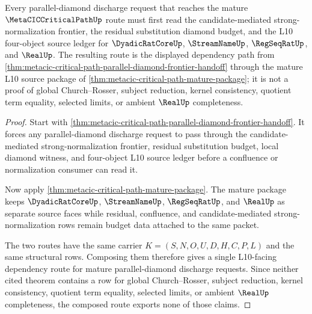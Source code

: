 \begin{theorem}
\label{thm:metaciccriticalpath-mature-l10-parallel-diamond-route}
Every parallel-diamond discharge request that reaches the mature $\MetaCICCriticalPathUp$ route must first read the candidate-mediated strong-normalization frontier, the residual substitution diamond budget, and the L10 four-object source ledger for $\DyadicRatCoreUp$, $\StreamNameUp$, $\RegSeqRatUp$, and $\RealUp$. The resulting route is the displayed dependency path from \autoref{thm:metacic-critical-path-parallel-diamond-frontier-handoff} through the mature L10 source package of \autoref{thm:metacic-critical-path-mature-package}; it is not a proof of global Church--Rosser, subject reduction, kernel consistency, quotient term equality, selected limits, or ambient $\RealUp$ completeness.
\end{theorem}
\begin{proof}
Start with \autoref{thm:metacic-critical-path-parallel-diamond-frontier-handoff}. It forces any parallel-diamond discharge request to pass through the candidate-mediated strong-normalization frontier, residual substitution budget, local diamond witness, and four-object L10 source ledger before a confluence or normalization consumer can read it.

Now apply \autoref{thm:metacic-critical-path-mature-package}. The mature package keeps $\DyadicRatCoreUp$, $\StreamNameUp$, $\RegSeqRatUp$, and $\RealUp$ as separate source faces while residual, confluence, and candidate-mediated strong-normalization rows remain budget data attached to the same packet.

The two routes have the same carrier $K=(S,N,O,U,D,H,C,P,L)$ and the same structural rows. Composing them therefore gives a single L10-facing dependency route for mature parallel-diamond discharge requests. Since neither cited theorem contains a row for global Church--Rosser, subject reduction, kernel consistency, quotient term equality, selected limits, or ambient $\RealUp$ completeness, the composed route exports none of those claims.
\end{proof}

